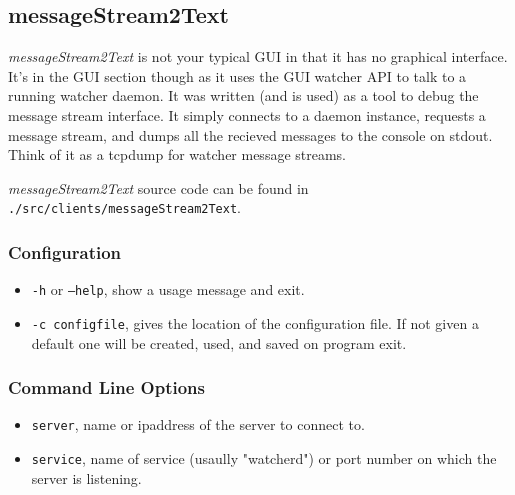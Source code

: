 \subsection{messageStream2Text}

{\it messageStream2Text} is not your typical GUI in that it has no graphical interface. It's in the GUI section though as it uses 
the GUI watcher API to talk to a running watcher daemon. It was written (and is used) as a tool to debug the message stream interface. It simply
connects to a daemon instance, requests a message stream, and dumps all the recieved messages to the console on stdout. Think of it as a 
tcpdump for watcher message streams. 

{\it messageStream2Text} source code can be found in {\tt .\slash src\slash clients\slash messageStream2Text}. 

\subsubsection{Configuration}

\begin{itemize}
\item {\tt -h} or {\tt --help}, show a usage message and exit. 
\item {\tt -c configfile}, gives the location of the configuration file. If not given a default one will be created, used, and saved on program exit.
\end{itemize}

\subsubsection{Command Line Options}

\begin{itemize}
\item {\tt server}, name or ipaddress of the server to connect to.
\item {\tt service}, name of service (usaully "watcherd") or port number on which the server is listening.
\end{itemize}

